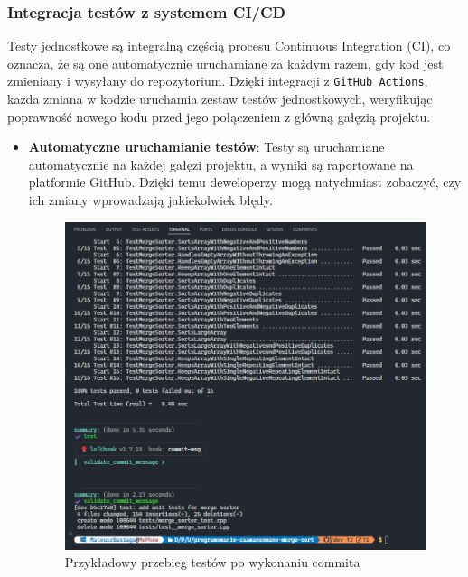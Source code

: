 \subsubsection{Integracja testów z systemem CI/CD}

Testy jednostkowe są integralną częścią procesu Continuous Integration (CI), co oznacza, że są one automatycznie uruchamiane za każdym razem, gdy kod jest zmieniany i wysyłany do repozytorium. Dzięki integracji z \texttt{GitHub Actions}, każda zmiana w kodzie uruchamia zestaw testów jednostkowych, weryfikując poprawność nowego kodu przed jego połączeniem z główną gałęzią projektu.

\begin{itemize}
  \item \textbf{Automatyczne uruchamianie testów}: Testy są uruchamiane automatycznie na każdej gałęzi projektu, a wyniki są raportowane na platformie GitHub. Dzięki temu deweloperzy mogą natychmiast zobaczyć, czy ich zmiany wprowadzają jakiekolwiek błędy.

        \begin{figure}[!htb]
          \begin{center}
            \includegraphics[width=\textwidth]{rys/tests_pre_commit.png}
            \caption{Przykładowy przebieg testów po wykonaniu commita}
            \label{rys:tests_pre_commit}
          \end{center}
        \end{figure}


\end{itemize}

